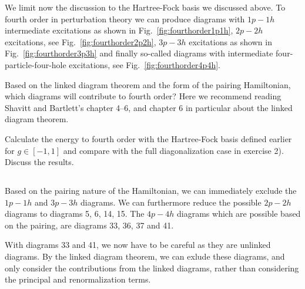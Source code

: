 We limit now the discussion to the Hartree-Fock basis  we discussed above.
To fourth order in perturbation theory we can produce diagrams with $1p-1h$ intermediate excitations as shown in Fig.~\ref{fig:fourthorder1p1h}, $2p-2h$ excitations, see Fig.~\ref{fig:fourthorder2p2h}, $3p-3h$ excitations as shown in Fig.~\ref{fig:fourthorder3p3h} and finally so-called diagrams with intermediate four-particle-four-hole excitations, see Fig.~\ref{fig:fourthorder4p4h}.

Based on the linked diagram theorem and the form of the pairing Hamiltonian, which diagrams will contribute to fourth order?
Here we recommend reading Shavitt and Bartlett's chapter 4--6, and chapter 6 in particular about the linked diagram theorem.

Calculate the energy to fourth order with the Hartree-Fock basis defined earlier for $g \in [-1,1]$ and compare with the full diagonalization case in exercise 2). %
Discuss the results.

\subsection{}
Based on the pairing nature of the Hamiltonian, we can immediately exclude the $1p-1h$ and $3p-3h$ diagrams.
We can furthermore reduce the possible $2p-2h$ diagrams to diagrams 5, 6, 14, 15.
The $4p-4h$ diagrams which are possible based on the pairing, are diagrams 33, 36, 37 and 41.

With diagrams 33 and 41, we now have to be careful as they are unlinked diagrams.
By the linked diagram theorem, we can exlude these diagrams, and only consider the contributions from the linked diagrams, rather than considering the principal and renormalization terms.

